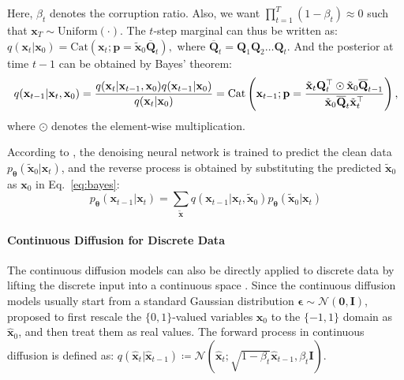 \documentclass{article}
\theoremstyle{plain}
\theoremstyle{definition}
\theoremstyle{remark}
\begin{document}
Here, $\beta_t$ denotes the corruption ratio. Also, we want ${\prod_{t=1}^T (1 - \beta_t) \approx 0}$ such that $\mathbf{x}_T \sim \mathrm{Uniform}(\cdot)$. The $t$-step marginal can thus be written as:
$
    q(\mathbf{x}_{t} | \mathbf{x}_{0}) =
    \mathrm{Cat}\left(\mathbf{x}_t ; \mathbf{p} =  \tilde{\mathbf{x}}_{0} \overline{\mathbf{Q}}_t \right),
$
where $\overline{\mathbf{Q}}_t = \mathbf{Q}_1 \mathbf{Q}_2 \dots \mathbf{Q}_t$. And the posterior at time $t-1$ can be obtained by Bayes' theorem:
\begin{equation}\label{eq:bayes}
q(\mathbf{x}_{t-1}|\mathbf{x}_t, \mathbf{x}_0)  = \frac{q(\mathbf{x}_{t}|\mathbf{x}_{t-1}, \mathbf{x}_0)q(\mathbf{x}_{t-1}|\mathbf{x}_0)}{q(\mathbf{x}_t | \mathbf{x}_0)}\\
= \mathrm{Cat} \left(
\mathbf{x}_{t-1} ; \mathbf{p} = \frac{
    \tilde{\mathbf{x}}_t \mathbf{Q}_t^{\top} \odot \tilde{\mathbf{x}}_0 \overline{\mathbf{Q}}_{t-1}
}{\tilde{\mathbf{x}}_0 \overline{\mathbf{Q}}_t \tilde{\mathbf{x}}_t^\top }
\right),
\end{equation}
where $\odot$ denotes the element-wise multiplication.



According to \citet{austin2021structured}, the denoising neural network is trained to predict the clean data $p_{\boldsymbol{\theta}}(\widetilde{\mathbf{x}}_0 | \mathbf{x}_t)$, and the reverse process is obtained by substituting the predicted $\widetilde{\mathbf{x}}_0$ as $\mathbf{x}_0$ in Eq.~\ref{eq:bayes}:
\begin{equation} \label{eq:discrete_sampling}
    p_{\boldsymbol{\theta}}(\mathbf{x}_{t-1}|\mathbf{x}_t) = \sum_{\widetilde{\mathbf{x}}} q(\mathbf{x}_{t-1}|\mathbf{x}_t, \widetilde{\mathbf{x}}_0)  p_{\boldsymbol{\theta}}(\widetilde{\mathbf{x}}_0 | \mathbf{x}_t)
\end{equation}

\paragraph{Continuous Diffusion for Discrete Data}
The continuous diffusion models \citep{song2019generative,ho2020denoising} can also be directly applied to discrete data by lifting the discrete input into a continuous space \citep{chen2022analog}. Since the continuous diffusion models usually start from a standard Gaussian distribution $\boldsymbol{\epsilon} \sim \mathcal{N}(\mathbf{0}, \mathbf{I})$, \citet{chen2022analog} proposed to first rescale the $\{0, 1\}$-valued variables $\mathbf{x}_0$ to the $\{-1, 1\}$ domain as $\hat{\mathbf{x}}_0$, and then treat them as real values. The forward process in continuous diffusion is defined as:
$
    q(\hat{\mathbf{x}}_t | \hat{\mathbf{x}}_{t-1}) 
    \coloneqq \mathcal{N}(\hat{\mathbf{x}}_{t} ; \sqrt{1 - \beta_t} \hat{\mathbf{x}}_{t-1}, \beta_t \mathbf{I}).
$
\end{document}
